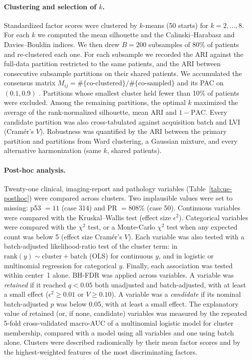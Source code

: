 \paragraph{Clustering and selection of $k$.}
Standardized factor scores were clustered by $k$-means (50 starts) for
$k=2,\dots,8$. For each $k$ we computed the mean silhouette and the
Calinski--Harabasz and Davies--Bouldin indices. We then drew $B=200$
subsamples of 80\% of patients and re-clustered each one. For each
subsample we recorded the ARI against the full-data partition restricted to
the same patients, and the ARI between consecutive subsample partitions on
their shared patients. We accumulated the consensus matrix
$M_{ij}=\#\{\text{co-clustered}\}/\#\{\text{co-sampled}\}$ and its PAC on
$(0.1,0.9)$ \citep{monti2003consensus,senbabaoglu2014critical}.
Partitions whose smallest cluster held fewer than 10\% of patients were
excluded. Among the remaining partitions, the optimal $k$ maximized the
average of the rank-normalized silhouette, mean ARI and $1-\mathrm{PAC}$.
Every candidate partition was also cross-tabulated against acquisition batch
and LVI (Cram\'er's $V$). Robustness was quantified by the ARI between the
primary partition and partitions from Ward clustering, a Gaussian mixture,
and every alternative harmonization (same $k$, shared patients).

\paragraph{Post-hoc analysis.}
Twenty-one clinical, imaging-report and pathology variables
(Table~\ref{tab:ue-posthoc}) were compared across clusters. Two implausible
values were set to missing: p53 $=11$ (case 314) and PR $=808\%$ (case 50).
Continuous variables were compared with the Kruskal--Wallis test (effect
size $\epsilon^2$). Categorical variables were compared with the
$\chi^2$ test, or a Monte-Carlo $\chi^2$ test when any expected count was
below 5 (effect size Cram\'er's $V$). Each variable was also tested with a
batch-adjusted likelihood-ratio test of the cluster term: in
$\mathrm{rank}(y)\sim\text{cluster}+\text{batch}$ (OLS) for continuous $y$,
and in logistic or multinomial regression for categorical $y$. Finally, each
association was tested within center~1 alone. BH-FDR was applied across
variables. A variable was \emph{retained} if it reached $q<0.05$ both
unadjusted and batch-adjusted, with at least a small effect
($\epsilon^2\ge0.01$ or $V\ge0.10$). A variable was a \emph{candidate} if
its nominal batch-adjusted $p$ was below 0.05, with at least a small effect.
The explanatory value of retained (or, if none, candidate) variables was
measured by the repeated 5-fold cross-validated macro-AUC of a multinomial
logistic model for cluster membership, compared with a model using all
variables and one using batch alone. Clusters were described radiomically by
their mean factor scores and by the highest-weighted features of the most
discriminating factors.

